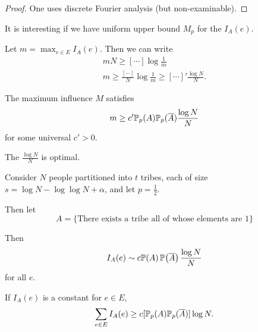 \begin{proof}
  One uses discrete Fourier analysis (but non-examinable).
\end{proof}

\begin{thm}
  \label{defn:random_walks_on_graphs:20}
  It is interesting if we have  uniform upper bound $M_{p}$ for the
  $I_{A}(e)$.

  Let $m = \max_{e \in E} I_{A}(e)$.  Then we can write
  \begin{align}
    \label{eq:25}
    mN \geq  [\cdots] \log \frac{1}{m} \\
    m \geq \frac{[\cdots]}{N} \log \frac{1}{m} \geq [\cdots]'
    \frac{\log N}{N}.
  \end{align}
\end{thm}

\begin{thm}
  \label{defn:random_walks_on_graphs:21}
  The maximum influence $M$ satisfies
  \begin{align}
    \label{eq:26}
    m \geq c' \Prob_{p}(A) \Prob_{p}(\overline A) \frac{\log N}{N}
  \end{align}
  for some universal $c' > 0$.

  The $\frac{\log N}{N}$ is optimal.
\end{thm}

\begin{exmp}[Tribes]
  \label{defn:random_walks_on_graphs:22}
 Consider $N$ people partitioned into $t$ tribes, each of size $s =
 \log N - \log \log N + \alpha$, and let $p = \frac{1}{2}$.

 Then let
 \begin{equation}
   \label{eq:27}
   A = \{ \text{There exists a tribe all of whose elements are
     1} \}   
 \end{equation}

 Then
 \begin{align}
   \label{eq:28}
   I_{A}(e) \sim c \Prob{A} \Prob{\overline A} \frac{\log N}{N}
 \end{align} for all $e$.
\end{exmp}

\begin{thm}
  \label{defn:random_walks_on_graphs:23}
  If $I_{A}(e)$ is a constant for $e \in E$,
  \begin{align}
    \label{eq:29}
    \sum_{e \in E} I_{A}(e) \geq c[\Prob_{p}(A) \Prob_{p}(\overline
    A)] \log N.
  \end{align}
\end{thm}

